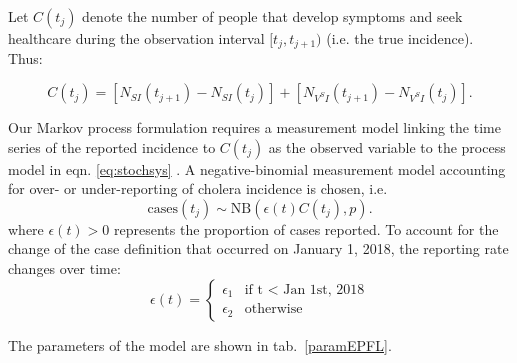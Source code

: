 Let \(C(t_j)\) denote the number of people that develop symptoms and seek healthcare during the
observation interval \([t_j, t_{j+1})\) (i.e. the true incidence). Thus:

\begin{equation}
    C(t_j) = [N_{SI}(t_{j+1}) - N_{SI}(t_j)] + [N_{V^SI}(t_{j+1}) - N_{V^SI}(t_j)].
\end{equation}

Our Markov process formulation requires a measurement model linking the time series of the reported incidence to \(C(t_j)\) as the observed variable to the process model in eqn. \eqref{eq:stochsys} . A negative-binomial measurement model accounting for over- or under-reporting of cholera incidence is chosen, i.e.
\[
	\text{cases}(t_j) \sim \text{NB}(\epsilon(t) C(t_j), p).
\]
where \(\epsilon(t) > 0\) represents the proportion of cases reported. To account for the change of the case definition that occurred on January 1, 2018, the reporting rate changes over time:
\begin{equation}
\epsilon(t) = \left\{
    \begin{array}{ll}
        \epsilon_1 & \mbox{if t $<$ Jan 1st, 2018} \\
        \epsilon_2 & \mbox{otherwise}
    \end{array}
\right.
\end{equation}

The parameters of the model are shown in tab.~\ref{paramEPFL}.




